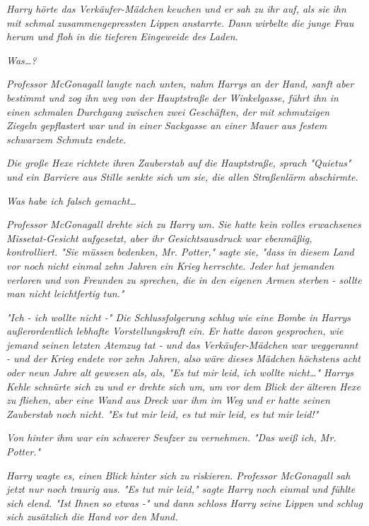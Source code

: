 {\emph{Harry hörte das Verkäufer-Mädchen keuchen und er sah zu ihr auf, als sie} \emph{ihn mit schmal zusammengepressten Lippen anstarrte. Dann wirbelte die junge Frau herum und floh in die tieferen Eingeweide des Laden.}

\emph{\emph{Was…?}}

\emph{Professor McGonagall langte nach unten, nahm Harrys an der Hand, sanft aber bestimmt und zog ihn weg von der Hauptstraße der Winkelgasse, führt ihn in einen schmalen Durchgang zwischen zwei Geschäften, der mit schmutzigen Ziegeln gepflastert war und in einer Sackgasse an einer Mauer aus festem schwarzem Schmutz endete.}

\emph{Die große Hexe richtete ihren Zauberstab auf die Hauptstraße, sprach} \emph{\emph{"Quietus"}} \emph{und ein Barriere aus Stille senkte sich um sie, die allen Straßenlärm abschirmte.}

\emph{\emph{Was habe ich falsch gemacht…}}

\emph{Professor McGonagall drehte sich zu Harry um. Sie hatte kein volles erwachsenes} \emph{Missetat-Gesicht} \emph{aufgesetzt, aber ihr Gesichtsausdruck war ebenmäßig, kontrolliert. "Sie müssen bedenken, Mr. Potter," sagte sie, "dass in diesem Land vor noch nicht einmal zehn Jahren ein Krieg herrschte. Jeder hat jemanden verloren und von Freunden zu sprechen, die in den eigenen Armen sterben - sollte man nicht leichtfertig tun."}

\emph{"Ich - ich wollte nicht -" Die Schlussfolgerung schlug wie eine Bombe in Harrys außerordentlich lebhafte Vorstellungskraft ein. Er hatte davon gesprochen, wie jemand seinen letzten Atemzug tat - und das Verkäufer-Mädchen war weggerannt - und der Krieg endete vor zehn Jahren, also wäre dieses Mädchen höchstens acht oder neun Jahre alt gewesen als, als, "Es tut mir leid, ich wollte nicht…" Harrys Kehle schnürte sich zu und er drehte sich um, um vor dem Blick der älteren Hexe zu fliehen, aber eine Wand aus Dreck war ihm im Weg und er hatte seinen Zauberstab noch nicht. "Es tut mir leid, es tut mir leid, es tut mir} \emph{\emph{leid!}"}

\emph{Von hinter ihm war ein schwerer Seufzer zu vernehmen. "Das weiß ich, Mr. Potter."}

\emph{Harry wagte es, einen Blick hinter sich zu riskieren. Professor McGonagall sah jetzt nur noch traurig aus. "Es tut mir leid," sagte Harry noch einmal und fühlte sich elend. "Ist Ihnen so etwas -" und dann schloss Harry seine Lippen und schlug sich zusätzlich die Hand vor den Mund.}

}
